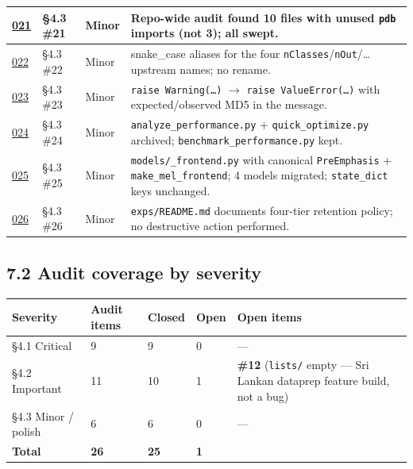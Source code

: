 \documentclass[10pt,a4paper]{article}
\renewcommand{\arraystretch}{1.15}
\begin{document}
\begin{center}
\begin{tabularx}{\textwidth}{|Y|Y|Y|Y|}
\hline
\href{docs/bugfixes/BUGFIX-021-remove-pdb-imports.md}{021} & §4.3 \#21 & Minor & Repo-wide audit found 10 files with unused \texttt{pdb} imports (not 3); all swept. \\
\hline
\href{docs/bugfixes/BUGFIX-022-camel-snake-case-aliases.md}{022} & §4.3 \#22 & Minor & snake\_case aliases for the four \texttt{nClasses}/\texttt{nOut}/\ldots{} upstream names; no rename. \\
\hline
\href{docs/bugfixes/BUGFIX-023-md5-mismatch-proper-error.md}{023} & §4.3 \#23 & Minor & \texttt{raise Warning(…)} $\rightarrow$ \texttt{raise ValueError(…)} with expected/observed MD5 in the message. \\
\hline
\href{docs/bugfixes/BUGFIX-024-consolidate-performance-scripts.md}{024} & §4.3 \#24 & Minor & \texttt{analyze\_performance.py} + \texttt{quick\_optimize.py} archived; \texttt{benchmark\_performance.py} kept. \\
\hline
\href{docs/bugfixes/BUGFIX-025-shared-audio-frontend.md}{025} & §4.3 \#25 & Minor & \texttt{models/\_frontend.py} with canonical \texttt{PreEmphasis} + \texttt{make\_mel\_frontend}; 4 models migrated; \texttt{state\_dict} keys unchanged. \\
\hline
\href{docs/bugfixes/BUGFIX-026-exps-cleanup-policy.md}{026} & §4.3 \#26 & Minor & \texttt{exps/README.md} documents four-tier retention policy; no destructive action performed. \\
\hline
\end{tabularx}
\end{center}

\subsection*{7.2 Audit coverage by severity}

\begin{center}
\small
\renewcommand{\arraystretch}{1.25}
\begin{tabularx}{\textwidth}{|Y|Y|Y|Y|Y|}
\hline
Severity & Audit items & Closed & Open & Open items \\
\hline
§4.1 Critical & 9 & 9 & 0 & --- \\
\hline
§4.2 Important & 11 & 10 & 1 & \textbf{\#12} (\texttt{lists/} empty --- Sri Lankan dataprep feature build, not a bug) \\
\hline
§4.3 Minor / polish & 6 & 6 & 0 & --- \\
\hline
\textbf{Total} & \textbf{26} & \textbf{25} & \textbf{1} &  \\
\hline
\end{tabularx}
\end{center}
\end{document}
